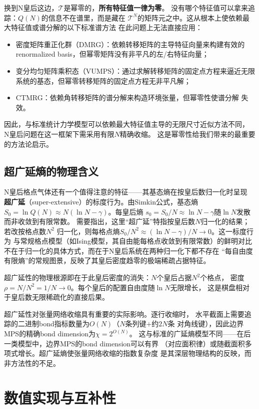 换到N皇后这边，$\mathcal{T}$是幂零的，\textbf{所有特征值一律为零}。
没有哪个特征值可以拿来追踪：$Q(N)$的信息不在谱里，而是藏在
$\mathcal{T}^{N}$的矩阵元之中。这从根本上使依赖最大特征值或谱分解的以下标准谱方法
在此问题上无法直接应用：
%
\begin{itemize}
  \item 密度矩阵重正化群（DMRG）：依赖转移矩阵的主导特征向量来构建有效的
  renormalized basis，但幂零矩阵没有非平凡的左/右特征向量；
  \item 变分均匀矩阵乘积态（VUMPS）：通过求解转移矩阵的固定点方程来逼近无限
  系统的基态，但幂零转移矩阵的固定点方程无非平凡解；
  \item CTMRG：依赖角转移矩阵的谱分解来构造环境张量，但幂零性使谱分解
  失效。
\end{itemize}
%
因此，与标准统计力学模型可以依赖最大特征值主导的无限尺寸近似方法不同，
N皇后问题在这一框架下需采用有限$N$精确收缩。
这是幂零性给我们带来的最重要的方法论启示。

\subsection{超广延熵的物理含义}

N皇后格点气体还有一个值得注意的特征——其基态熵在按皇后数归一化时呈现
\textbf{超广延}（super-extensive）的标度行为。由Simkin公式，基态熵
$S_{0}=\ln Q(N)\approx N(\ln N-\gamma)$。每皇后熵
$s_{0}=S_{0}/N\approx\ln N-\gamma$随$\ln N$发散而非收敛到有限常数。
需要指出，这里``超广延''特指按皇后数$N$归一化的结果；若改按格点数$N^{2}$
归一化，则每格点熵$S_{0}/N^{2}\approx(\ln N-\gamma)/N\to0$。这一标度行为
与常规格点模型（如Ising模型，其自由能每格点收敛到有限常数）的鲜明对比
不在于归一化的具体方式，而在于N皇后系统在两种归一化下都不存在
``每自由度有限熵''的常规图景，反映了其皇后密度趋零的极端稀疏占据特征。

超广延性的物理根源即在于此皇后密度的消失：$N$个皇后占据$N^{2}$个格点，
密度$\rho=N/N^{2}=1/N\to0$。每个皇后的配置自由度随$\ln N$无限增长，
这是棋盘相对于皇后数无限稀疏化的直接后果。

超广延性对张量网络收缩具有重要的实际影响。逐行收缩时，
水平截面上需要追踪的二进制bond指标数量为$O(N)$（$N$条列键$+$约$2N$条
对角线键），因此边界MPS的精确bond dimension为$\chi=2^{O(N)}$。
这与标准的广延熵模型不同——在后一类模型中，边界MPS的bond dimension可以有界
（对应面积律）或随截面积多项式增长。超广延熵使张量网络收缩的指数复杂度
是其深层物理结构的反映，而非方法性的不足。

\section{数值实现与互补性}

